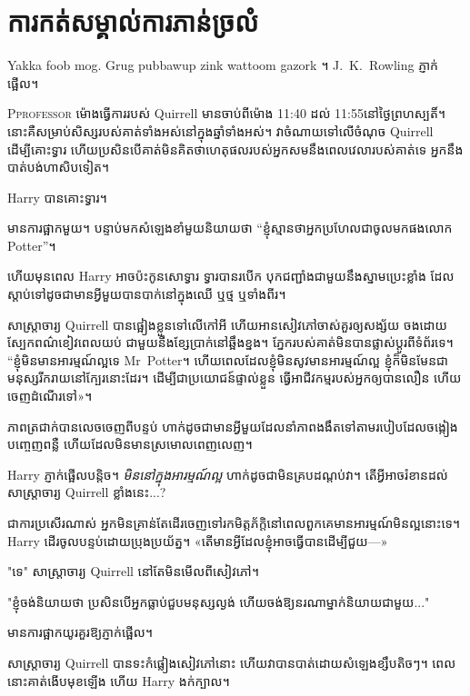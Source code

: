 \chapter{ការកត់សម្គាល់ការភាន់ច្រលំ}

\begin{chapterOpeningAuthorNote}
Yakka foob mog. Grug pubbawup zink wattoom gazork ។ J.~K.~Rowling ភ្ញាក់ផ្អើល។
\end{chapterOpeningAuthorNote}

\lettrine{P}{professor} ម៉ោងធ្វើការរបស់ Quirrell មានចាប់ពីម៉ោង 11:40 ដល់ 11:55\am នៅថ្ងៃព្រហស្បតិ៍។ នោះគឺសម្រាប់សិស្សរបស់គាត់ទាំងអស់នៅក្នុងឆ្នាំទាំងអស់។ វាចំណាយទៅលើចំណុច Quirrell ដើម្បីគោះទ្វារ ហើយប្រសិនបើគាត់មិនគិតថាហេតុផលរបស់អ្នកសមនឹងពេលវេលារបស់គាត់ទេ អ្នកនឹងបាត់បង់ហាសិបទៀត។

Harry បានគោះទ្វារ។

មានការផ្អាកមួយ។ បន្ទាប់​មក​សំឡេង​ខាំ​មួយ​និយាយ​ថា “ខ្ញុំ​ស្មាន​ថា​អ្នក​ប្រហែល​ជា​ចូល​មក​ផង​លោក ~ Potter”។

ហើយមុនពេល Harry អាចប៉ះកូនសោទ្វារ ទ្វារបានរបើក បុកជញ្ជាំងជាមួយនឹងស្នាមប្រេះខ្លាំង ដែលស្តាប់ទៅដូចជាមានអ្វីមួយបានបាក់នៅក្នុងឈើ ឬថ្ម ឬទាំងពីរ។

សាស្ត្រាចារ្យ Quirrell បាន​ផ្អៀង​ខ្លួន​ទៅ​លើ​កៅអី ហើយ​អាន​សៀវភៅ​ចាស់​គួរ​ឲ្យ​សង្ស័យ ចង​ដោយ​ស្បែក​ពណ៌​ខៀវ​ពេល​យប់ ជាមួយ​នឹង​ខ្សែ​ប្រាក់​នៅ​ឆ្អឹងខ្នង។ ភ្នែករបស់គាត់មិនបានផ្លាស់ប្តូរពីទំព័រទេ។ “ខ្ញុំ​មិន​មាន​អារម្មណ៍​ល្អ​ទេ Mr~Potter។ ហើយ​ពេល​ដែល​ខ្ញុំ​មិន​សូវ​មាន​អារម្មណ៍​ល្អ ខ្ញុំ​ក៏​មិន​មែន​ជា​មនុស្ស​រីករាយ​នៅ​ក្បែរ​នោះ​ដែរ។ ដើម្បី​ជា​ប្រយោជន៍​ផ្ទាល់​ខ្លួន ធ្វើ​អាជីវកម្ម​របស់​អ្នក​ឲ្យ​បាន​លឿន ហើយ​ចេញ​ដំណើរ​ទៅ»។

ភាព​ត្រជាក់​បាន​លេច​ចេញ​ពី​បន្ទប់ ហាក់​ដូច​ជា​មាន​អ្វី​មួយ​ដែល​នាំ​ភាព​ងងឹត​ទៅ​តាម​របៀប​ដែល​ចង្កៀង​បញ្ចេញ​ពន្លឺ ហើយ​ដែល​មិន​មាន​ស្រមោល​ពេញលេញ។

Harry ភ្ញាក់​ផ្អើល​បន្តិច។ \emph{មិននៅក្នុងអារម្មណ៍ល្អ} ហាក់ដូចជាមិនគ្របដណ្តប់វា។ តើអ្វីអាចរំខានដល់សាស្រ្តាចារ្យ Quirrell ខ្លាំងនេះ...?

ជាការប្រសើរណាស់ អ្នកមិនគ្រាន់តែដើរចេញទៅរកមិត្តភ័ក្តិនៅពេលពួកគេមានអារម្មណ៍មិនល្អនោះទេ។ Harry ដើរចូលបន្ទប់ដោយប្រុងប្រយ័ត្ន។ «​តើ​មាន​អ្វី​ដែល​ខ្ញុំ​អាច​ធ្វើ​បាន​ដើម្បី​ជួយ—»

"ទេ" សាស្ត្រាចារ្យ Quirrell នៅតែមិនមើលពីសៀវភៅ។

"ខ្ញុំចង់និយាយថា ប្រសិនបើអ្នកធ្លាប់ជួបមនុស្សល្ងង់ ហើយចង់ឱ្យនរណាម្នាក់និយាយជាមួយ..."

មានការផ្អាកយូរគួរឱ្យភ្ញាក់ផ្អើល។

សាស្ត្រាចារ្យ Quirrell បានទះកំផ្លៀងសៀវភៅនោះ ហើយវាបានបាត់ដោយសំឡេងខ្សឹបតិចៗ។ ពេលនោះគាត់ងើបមុខឡើង ហើយ Harry ងក់ក្បាល។

